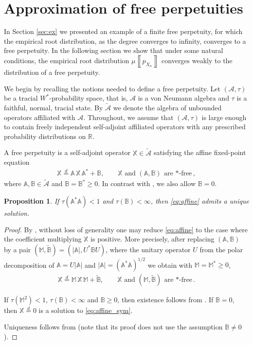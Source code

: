 \documentclass[a4paper,11pt]{amsart}
\numberwithin{equation}{section}
\newtheorem{proposition}[theorem]{Proposition}
\newcommand{\R}{\mathbb{R}}
\def \X {{\mathbb X}}
\def \A {{\mathbb A}}
\def \B {{\mathbb B}}
\def \M {{\mathbb M}}
\newcommand{\meas}[1]{\mu\! \left\llbracket #1 \right\rrbracket}
\begin{document}
\section{Approximation of free perpetuities}\label{sec:approx}

In Section \ref{sec:ex} we presented an example of a finite free perpetuity, for which the empirical root distribution, as the degree converges to infinity, converges to a free perpetuity. In the following section we show that under some natural conditions, the empirical root distribution $\meas{p_{X_n}}$ converges weakly to the distribution of a free perpetuity. 

We begin by recalling the notions needed to define a free perpetuity.
Let $(\mathcal{A},\tau)$ be a tracial $W^*$-probability space, that is,
$\mathcal{A}$ is a von Neumann algebra and $\tau$ is a faithful, normal, tracial state. By $\tilde{\mathcal{A}}$ we denote the algebra of unbounded operators affiliated with $\mathcal{A}$.  Throughout, we assume that $(\mathcal A,\tau)$ is large enough to contain freely independent self-adjoint affiliated operators with any prescribed probability distributions on $\R$.

A free perpetuity is a self-adjoint operator \(\X\in \tilde{\mathcal{A}}\) satisfying the affine fixed-point equation
\begin{align}\label{eq:affine}
\X \stackrel{d}{=} \A\, \X \,\A^\ast + \B,
\qquad \X\mbox{ and }
(\A,\B)\ \text{are $*$-free},
\end{align}
where \(\A,\B\in\tilde{\mathcal{A}}\) and \(\B=\B^\ast\geq0\). In contrast with \cite{FreePerp}, we also allow \(\B=0\). 

\begin{proposition}\label{prop:unique_free}
If \(\tau(\A^\ast\A)<1\) and $\tau(\B)<\infty$,
then \eqref{eq:affine} admits a unique  solution.
\end{proposition}

\begin{proof}
By \cite[Remark 1.1]{FreePerp},  without loss of generality one may reduce \eqref{eq:affine} to the case where the coefficient multiplying \(\X\) is positive. More precisely, after replacing \((\A,\B)\) by a pair \((\M,\tilde{\B}) = (|\A|,U^\ast\B U)\), where the unitary operator $U$ from the polar decomposition of $\A=U|\A|$ and $|\A|=(\A^\ast\A)^{1/2}$ we obtain  with \(\M=\M^\ast\ge 0\), 
\begin{align}\label{eq:affine_sym}
\X \stackrel{d}{=} \M\,\X\,\M+\tilde{\B}, \qquad \X\mbox{ and } (\M,\tilde{\B})\ \text{are $*$-free}.
\end{align}

If \(\tau(\M^2)<1\), $\tau(\B)<\infty$ and $\B\geq0$, then existence follows from \cite[Theorem 4.6 (iii)]{FreePerp}. If \(\B=0\), then \(\X\stackrel{d}{=}0\) is a solution to
\eqref{eq:affine_sym}.

Uniqueness follows from \cite[Theorem 4.2]{FreePerp} (note that its proof does not use the assumption $\B\neq 0$). 
\end{proof}
\end{document}
